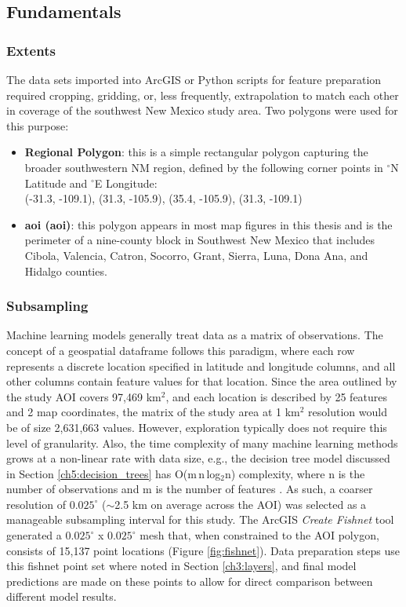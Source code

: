 \subsection{Fundamentals}

\subsubsection{Extents}

The data sets imported into ArcGIS or Python scripts for feature preparation required cropping, gridding, or, less frequently, extrapolation to match each other in coverage of the southwest New Mexico study area. Two polygons were used for this purpose:

\begin{itemize}
\item \textbf{Regional Polygon}: this is a simple rectangular polygon capturing the broader southwestern NM region, defined by the following corner points in $^\circ$N Latitude and $^\circ$E Longitude: \\ (-31.3, -109.1), (31.3, -105.9), (35.4, -105.9), (31.3, -109.1)
\item \textbf{\acrlong{aoi} (\acrshort{aoi})}: this polygon appears in most map figures in this thesis and is the perimeter of a nine-county block in Southwest New Mexico that includes Cibola, Valencia, Catron, Socorro, Grant, Sierra, Luna, Dona Ana, and Hidalgo counties.
\end{itemize}

\subsubsection{Subsampling}\label{ssn:fishnet}

Machine learning models generally treat data as a matrix of observations. The concept of a geospatial dataframe follows this paradigm, where each row represents a discrete location specified in latitude and longitude columns, and all other columns contain feature values for that location. Since the area outlined by the study AOI covers 97,469 km$^2$, and each location is described by 25 features and 2 map coordinates, the matrix of the study area at 1 km$^2$ resolution would be of size 2,631,663 values. However, exploration typically does not require this level of granularity. Also, the time complexity of many machine learning methods grows at a non-linear rate with data size, e.g., the decision tree model discussed in Section \ref{ch5:decision_trees} has O(m\,n\,log$_{2}$n) complexity, where n is the number of observations and m is the number of features \citep{sani_computational_2018}. As such, a coarser resolution of $0.025^\circ$ ($\sim$2.5 km on average across the AOI) was selected as a manageable subsampling interval for this study. The ArcGIS \textit{Create Fishnet} tool generated a $0.025^\circ$ x $0.025^\circ$ mesh that, when constrained to the AOI polygon, consists of 15,137 point locations (Figure \ref{fig:fishnet}). Data preparation steps use this fishnet point set where noted in Section \ref{ch3:layers}, and final model predictions are made on these points to allow for direct comparison between different model results. 

